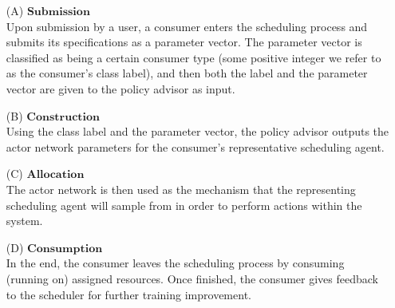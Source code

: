 \documentclass{article}
\theoremstyle{definition}
\theoremstyle{remark}
\begin{document}
		\begin{enumerate}
			\item[(A)] \mbox{$\mathbf{Submission}$}\\
			Upon submission by a user, a consumer enters the scheduling process and submits its specifications as a parameter vector. The parameter vector is classified as being a certain consumer type (some positive integer we refer to as the consumer's class label), and then both the label and the parameter vector are given to the policy advisor as input. 
			\item[(B)] \mbox{$\mathbf{Construction}$}\\
			Using the class label and the parameter vector, the policy advisor outputs the actor network parameters for the consumer's representative scheduling agent.
			
			\newpage
			\item[(C)] \mbox{$\mathbf{Allocation}$}\\
			The actor network is then used as the mechanism that the representing scheduling agent will sample from in order to perform actions within the system. 
			
			\item[(D)] \mbox{$\mathbf{Consumption}$}\\
			In the end, the consumer leaves the scheduling process by consuming (running on) assigned resources. Once finished, the consumer gives feedback to the scheduler for further training improvement.
		\end{enumerate}
\end{document}
